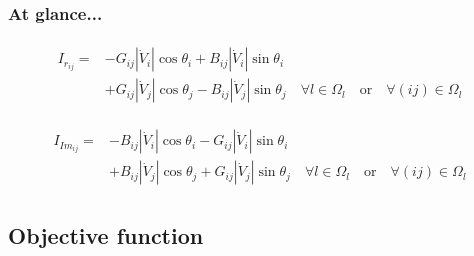 \documentclass[
	11pt, %
	aspectratio=169, %
]{beamer}
\begin{document}
\begin{frame}
	\frametitle{At glance...}	
	
	\begin{align*}
		\begin{split}
	 		I_{r_{ij}} = &-G_{ij}\left\lvert \dot{V}_{i} \right\rvert \cos{\theta_{i}} + B_{ij}\left\lvert \dot{V}_{i} \right\rvert \sin{\theta_{i}} \\
					&+ G_{ij}\left\lvert \dot{V}_{j} \right\rvert \cos{\theta_{j}} - B_{ij}\left\lvert \dot{V}_{j} \right\rvert \sin{\theta_{j}} \quad \forall l \in \Omega_{l} \quad \text{or} \quad \forall (ij) \in \Omega_{l}
		\end{split}
	\end{align*}

	\begin{align*}
		\begin{split}
	 		I_{Im_{ij}} = &-B_{ij}\left\lvert \dot{V}_{i} \right\rvert \cos{\theta_{i}} - G_{ij}\left\lvert \dot{V}_{i} \right\rvert \sin{\theta_{i}} \\
			&+ B_{ij}\left\lvert \dot{V}_{j} \right\rvert \cos{\theta_{j}} + G_{ij}\left\lvert \dot{V}_{j} \right\rvert \sin{\theta_{j}} \quad \forall l \in \Omega_{l} \quad \text{or} \quad \forall (ij) \in \Omega_{l}
		\end{split}
	\end{align*}

	
\end{frame}




\subsection{Objective function}
\end{document}
